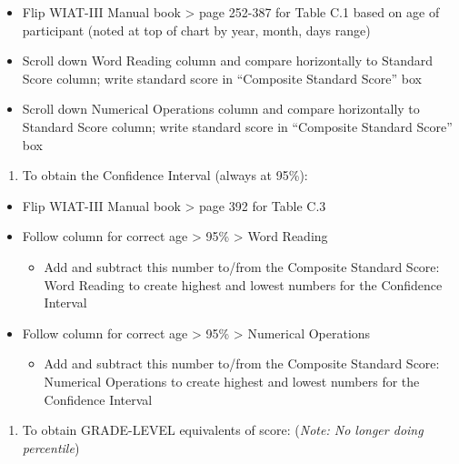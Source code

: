 \documentclass[]{book}
\providecommand{\tightlist}{%
  \setlength{\itemsep}{0pt}\setlength{\parskip}{0pt}}
\begin{document}
\begin{itemize}
\tightlist
\item
  Flip WIAT-III Manual book \textgreater{} page 252-387 for Table C.1
  based on age of participant (noted at top of chart by year, month,
  days range)
\item
  Scroll down Word Reading column and compare horizontally to Standard
  Score column; write standard score in ``Composite Standard Score'' box
\item
  Scroll down Numerical Operations column and compare horizontally to
  Standard Score column; write standard score in ``Composite Standard
  Score'' box
\end{itemize}

\begin{enumerate}
\def\labelenumi{\arabic{enumi}.}
\setcounter{enumi}{2}
\tightlist
\item
  To obtain the Confidence Interval (always at 95\%):
\end{enumerate}

\begin{itemize}
\tightlist
\item
  Flip WIAT-III Manual book \textgreater{} page 392 for Table C.3
\item
  Follow column for correct age \textgreater{} 95\% \textgreater{} Word
  Reading

  \begin{itemize}
  \tightlist
  \item
    Add and subtract this number to/from the Composite Standard Score:
    Word Reading to create highest and lowest numbers for the Confidence
    Interval
  \end{itemize}
\item
  Follow column for correct age \textgreater{} 95\% \textgreater{}
  Numerical Operations

  \begin{itemize}
  \tightlist
  \item
    Add and subtract this number to/from the Composite Standard Score:
    Numerical Operations to create highest and lowest numbers for the
    Confidence Interval
  \end{itemize}
\end{itemize}

\begin{enumerate}
\def\labelenumi{\arabic{enumi}.}
\setcounter{enumi}{3}
\tightlist
\item
  To obtain GRADE-LEVEL equivalents of score: (\emph{Note: No longer
  doing percentile})
\end{enumerate}
\end{document}
